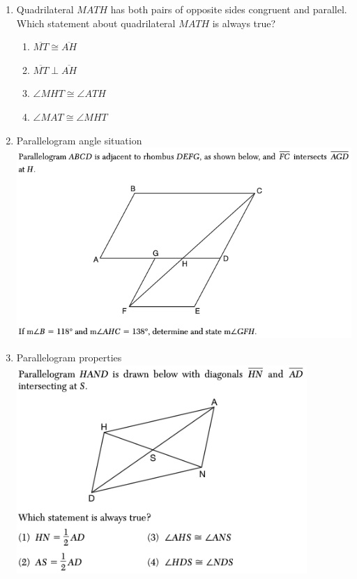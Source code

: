 \documentclass[12pt, oneside]{article}
\begin{document}
\begin{enumerate}
\item Quadrilateral $MATH$ has both pairs of opposite sides congruent and parallel. Which statement about quadrilateral $MATH$ is always true?
\begin{enumerate}
    \item $\overline{MT} \cong \overline{AH}$
    \item $\overline{MT} \perp \overline{AH}$
    \item $\angle MHT \cong \angle ATH$
    \item $\angle MAT \cong \angle MHT$
\end{enumerate}

\item Parallelogram angle situation\\
\includegraphics[width=14cm]{R-5images/R-5QuadrilateralsD.png}

\newpage
\item Parallelogram properties\\
\includegraphics[width=11cm]{R-5images/R-5QuadrilateralsG.png}


\end{enumerate}
\end{document}
